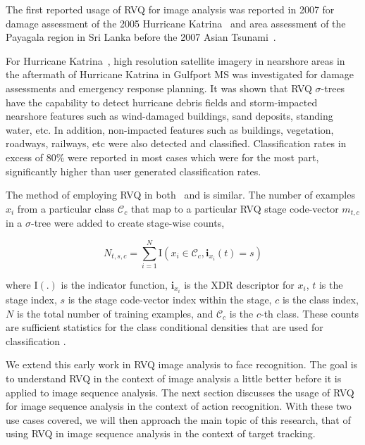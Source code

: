 The first reported usage of RVQ for image analysis was reported in 2007 for damage assessment of the 2005 Hurricane Katrina~\cite{2007_JNL_Katrina_Barnes} and area assessment of the Payagala region in Sri Lanka before the 2007 Asian Tsunami~\cite{2007_JNL_IDDM_Barnes}.    

For Hurricane Katrina~\cite{2007_JNL_Katrina_Barnes}, high resolution satellite imagery in nearshore areas in the aftermath of Hurricane Katrina in Gulfport MS was investigated for damage assessments and emergency response planning.  It was shown that RVQ $\sigma$-trees have the capability to detect hurricane debris fields and storm-impacted nearshore features such as wind-damaged buildings, sand deposits, standing water, etc.  In addition, non-impacted features such as buildings, vegetation, roadways, railways, etc were also detected and classified.  Classification rates in excess of 80\% were reported in most cases which were for the most part, significantly higher than user generated classification rates. 

The method of employing RVQ in both~\cite{2007_JNL_Katrina_Barnes} and \cite{2007_JNL_IDDM_Barnes} is similar.  The number of examples $x_i$ from a particular class $\mathcal{C}_c$ that map to a particular RVQ stage code-vector $m_{t,c}$ in a $\sigma$-tree were added to create stage-wise counts,

\begin{equation}
N_{t,s,c} = \sum\limits_{i=1}^N\mathrm{I}(x_i \in \mathcal{C}_c, \mathbf{i}_{x_i}(t)=s)
\end{equation}

where $\mathrm{I}(.)$ is the indicator function, $\mathbf{i}_{x_i}$ is the XDR descriptor for $x_i$, $t$ is the stage index, $s$ is the stage code-vector index within the stage, $c$ is the class index, $N$ is the total number of training examples, and $\mathcal{C}_c$ is the $c$-th class.  These counts are sufficient statistics for the class conditional densities that are used for classification \cite{1993_BOOK_SSP_Kay}.

We extend this early work in RVQ image analysis to face recognition.  The goal is to understand RVQ in the context of image analysis a little better before it is applied to image sequence analysis.  The next section discusses the usage of RVQ for image sequence analysis in the context of action recognition.  With these two use cases covered, we will then approach the main topic of this research, that of using RVQ in image sequence analysis in the context of target tracking.

